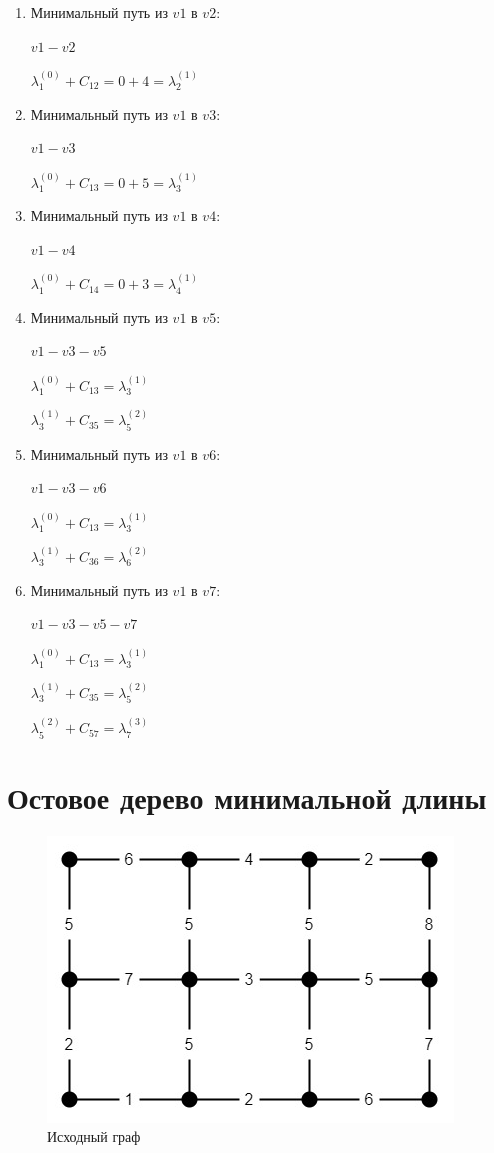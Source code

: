 \begin{enumerate}
    \item Минимальный путь из $v1$ в $v2$:
    
    $v1 - v2$
    
    $\lambda^{(0)}_1 + C_{12} = 0 + 4 = \lambda^{(1)}_2$
     \item Минимальный путь из $v1$ в $v3$:
    
    $v1 - v3$
    
    $\lambda^{(0)}_1 + C_{13} = 0 + 5 = \lambda^{(1)}_3$
     \item Минимальный путь из $v1$ в $v4$:
    
    $v1 - v4$
    
    $\lambda^{(0)}_1 + C_{14} = 0 + 3 = \lambda^{(1)}_4$
     \item Минимальный путь из $v1$ в $v5$:
    
    $v1 - v3 - v5$
    
    $\lambda^{(0)}_1 + C_{13} = \lambda^{(1)}_3$
    
    $\lambda^{(1)}_3 + C_{35} = \lambda^{(2)}_5$
     \item Минимальный путь из $v1$ в $v6$:
    
    $v1 - v3 - v6$
    
    $\lambda^{(0)}_1 + C_{13} = \lambda^{(1)}_3$
    
    $\lambda^{(1)}_3 + C_{36} = \lambda^{(2)}_6$
     \item Минимальный путь из $v1$ в $v7$:
    
    $v1 - v3 - v5 - v7$
    
    $\lambda^{(0)}_1 + C_{13} = \lambda^{(1)}_3$
    
    $\lambda^{(1)}_3 + C_{35} = \lambda^{(2)}_5$
    
    $\lambda^{(2)}_5 + C_{57} = \lambda^{(3)}_7$
\end{enumerate}
\section{Остовое дерево минимальной длины}
\begin{figure}[!htb]
	\centering
	\includegraphics[width=\linewidth]{Images/graph4.jpg}
	\caption{Исходный граф}
	\label{fig:image4}
\end{figure}

